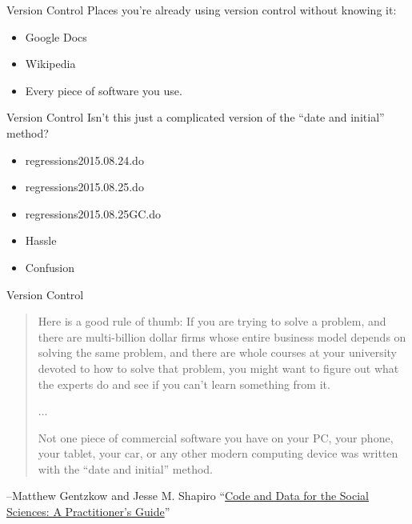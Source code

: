 \documentclass{beamer}
\begin{document}
\begin{frame}{Version Control}
Places you're already using version control without knowing it:
\begin{itemize}
	\item
	Google Docs
	\item
	Wikipedia
	\item
	Every piece of software you use.
\end{itemize}
\end{frame}

\begin{frame}{Version Control}
Isn't this just a complicated version of the ``date and initial'' method?
\begin{itemize}
\item regressions2015.08.24.do
\item regressions2015.08.25.do
\item regressions2015.08.25GC.do
\item Hassle
\item Confusion \href{http://www.phdcomics.com/comics/archive.php?comicid=1531}{}
\end{itemize}
\end{frame}

\begin{frame}{Version Control}
\begin{quote}Here is a good rule of thumb: If you are trying to solve a problem, and there are multi-billion dollar  firms  whose  entire  business  model  depends  on  solving  the  same  problem,  and  there  are whole courses at your university devoted to how to solve that problem, you might want to figure out what the experts do and see if you can’t learn something from it.

...

Not one piece of commercial software you have on your PC, your phone, your tablet,
your car, or any other modern computing device was written with the “date and initial” method.
\end{quote}
--Matthew Gentzkow and Jesse M. Shapiro ``\href{http://web.stanford.edu/~gentzkow/research/CodeAndData.pdf}{Code and Data for the Social Sciences: A Practitioner's Guide}''
\end{frame}
\end{document}
